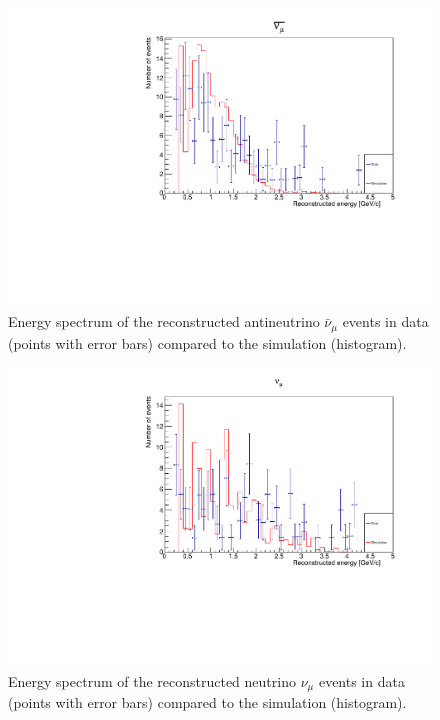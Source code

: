 




\begin{figure}[h!]
\centering
\includegraphics[width=.9\textwidth]{figures/NeutrinoChap/nuBarEventNewest.pdf}
\caption{Energy spectrum of the reconstructed antineutrino $\bar{\nu}_\mu$ events in data (points with error bars) compared to the simulation (histogram).}
\label{fig:datanumubar}
\end{figure}

\begin{figure}[h!]
\centering
\includegraphics[width=.9\textwidth]{figures/NeutrinoChap/nuEventNewest.pdf}
\caption{Energy spectrum of the reconstructed neutrino $\nu_\mu$ events in data (points with error bars) compared to the simulation (histogram).}
\label{fig:datanumu}
\end{figure}



